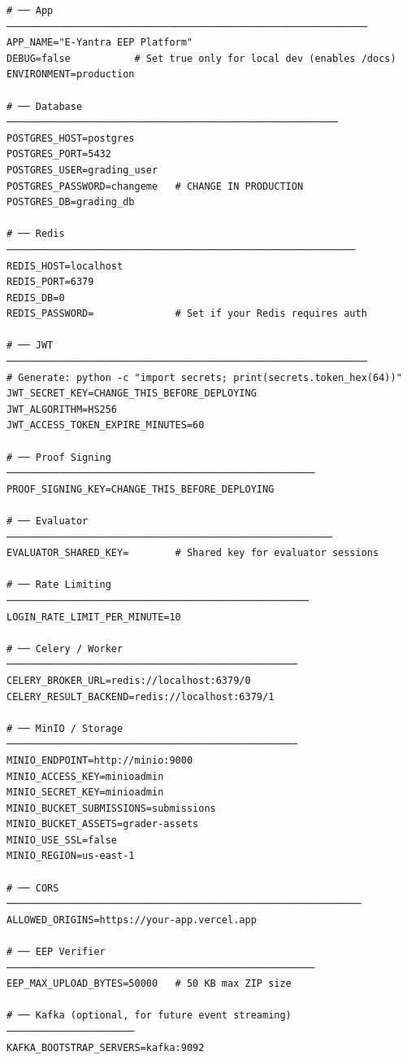 \documentclass[12pt,a4paper]{article}
\begin{document}
\begin{lstlisting}[style=envfile]
# ── App ──────────────────────────────────────────────────────────────
APP_NAME="E-Yantra EEP Platform"
DEBUG=false           # Set true only for local dev (enables /docs)
ENVIRONMENT=production

# ── Database ─────────────────────────────────────────────────────────
POSTGRES_HOST=postgres
POSTGRES_PORT=5432
POSTGRES_USER=grading_user
POSTGRES_PASSWORD=changeme   # CHANGE IN PRODUCTION
POSTGRES_DB=grading_db

# ── Redis ────────────────────────────────────────────────────────────
REDIS_HOST=localhost
REDIS_PORT=6379
REDIS_DB=0
REDIS_PASSWORD=              # Set if your Redis requires auth

# ── JWT ──────────────────────────────────────────────────────────────
# Generate: python -c "import secrets; print(secrets.token_hex(64))"
JWT_SECRET_KEY=CHANGE_THIS_BEFORE_DEPLOYING
JWT_ALGORITHM=HS256
JWT_ACCESS_TOKEN_EXPIRE_MINUTES=60

# ── Proof Signing ─────────────────────────────────────────────────────
PROOF_SIGNING_KEY=CHANGE_THIS_BEFORE_DEPLOYING

# ── Evaluator ────────────────────────────────────────────────────────
EVALUATOR_SHARED_KEY=        # Shared key for evaluator sessions

# ── Rate Limiting ────────────────────────────────────────────────────
LOGIN_RATE_LIMIT_PER_MINUTE=10

# ── Celery / Worker ──────────────────────────────────────────────────
CELERY_BROKER_URL=redis://localhost:6379/0
CELERY_RESULT_BACKEND=redis://localhost:6379/1

# ── MinIO / Storage ──────────────────────────────────────────────────
MINIO_ENDPOINT=http://minio:9000
MINIO_ACCESS_KEY=minioadmin
MINIO_SECRET_KEY=minioadmin
MINIO_BUCKET_SUBMISSIONS=submissions
MINIO_BUCKET_ASSETS=grader-assets
MINIO_USE_SSL=false
MINIO_REGION=us-east-1

# ── CORS ─────────────────────────────────────────────────────────────
ALLOWED_ORIGINS=https://your-app.vercel.app

# ── EEP Verifier ─────────────────────────────────────────────────────
EEP_MAX_UPLOAD_BYTES=50000   # 50 KB max ZIP size

# ── Kafka (optional, for future event streaming) ──────────────────────
KAFKA_BOOTSTRAP_SERVERS=kafka:9092
\end{lstlisting}
\end{document}
